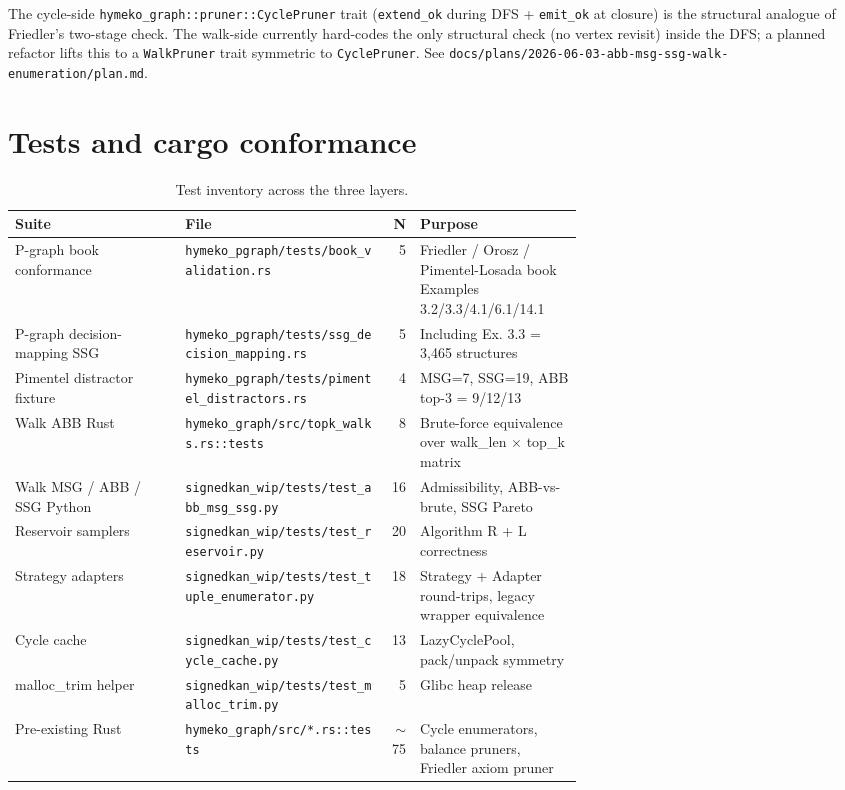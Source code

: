 \documentclass[11pt]{article}
\begin{document}
The cycle-side \texttt{hymeko\_graph::pruner::CyclePruner} trait
(\texttt{extend\_ok} during DFS + \texttt{emit\_ok} at closure) is
the structural analogue of Friedler's two-stage check. The walk-side
currently hard-codes the only structural check (no vertex revisit)
inside the DFS; a planned refactor lifts this to a
\texttt{WalkPruner} trait symmetric to \texttt{CyclePruner}. See
\texttt{docs/plans/2026-06-03-abb-msg-ssg-walk-enumeration/plan.md}.

\section{Tests and cargo conformance}

\begin{table}[h]
\centering
\small
\begin{tabular}{p{0.30\linewidth}p{0.36\linewidth}rl}
\toprule
Suite & File & N & Purpose \\
\midrule
P-graph book conformance & \texttt{hymeko\_pgraph/tests/book\_validation.rs} & 5 & Friedler / Orosz / Pimentel-Losada book Examples 3.2/3.3/4.1/6.1/14.1 \\
P-graph decision-mapping SSG & \texttt{hymeko\_pgraph/tests/ssg\_decision\_mapping.rs} & 5 & Including Ex. 3.3 = 3{,}465 structures \\
Pimentel distractor fixture & \texttt{hymeko\_pgraph/tests/pimentel\_distractors.rs} & 4 & MSG=7, SSG=19, ABB top-3 = 9/12/13 \\
Walk ABB Rust & \texttt{hymeko\_graph/src/topk\_walks.rs::tests} & 8 & Brute-force equivalence over walk\_len $\times$ top\_k matrix \\
Walk MSG / ABB / SSG Python & \texttt{signedkan\_wip/tests/test\_abb\_msg\_ssg.py} & 16 & Admissibility, ABB-vs-brute, SSG Pareto \\
Reservoir samplers & \texttt{signedkan\_wip/tests/test\_reservoir.py} & 20 & Algorithm R + L correctness \\
Strategy adapters & \texttt{signedkan\_wip/tests/test\_tuple\_enumerator.py} & 18 & Strategy + Adapter round-trips, legacy wrapper equivalence \\
Cycle cache & \texttt{signedkan\_wip/tests/test\_cycle\_cache.py} & 13 & LazyCyclePool, pack/unpack symmetry \\
malloc\_trim helper & \texttt{signedkan\_wip/tests/test\_malloc\_trim.py} & 5 & Glibc heap release \\
Pre-existing Rust & \texttt{hymeko\_graph/src/*.rs::tests} & $\sim$75 & Cycle enumerators, balance pruners, Friedler axiom pruner \\
\bottomrule
\end{tabular}
\caption{Test inventory across the three layers.}
\end{table}
\end{document}
